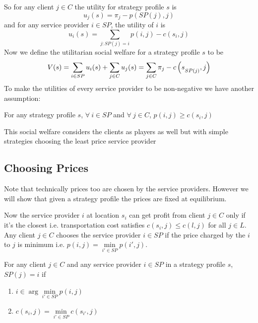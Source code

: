 So for any client $j\in C$ the utility for strategy profile $s$ is $$u_j(s)=\pi_j-p(SP(j),j)$$  and for  any service provider $i\in SP$, the utility of $i$ is $$u_i(s)=\sum\limits_{j\colon SP(j)=i}p(i,j)-c(s_i,j)$$ Now we define the utilitarian social welfare for a strategy profile $s$ to be $$V(s)=\sum\limits_{i\in SP}u_i(s)+\sum\limits_{j\in C}u_j(s)=\sum\limits_{j\in C}\pi_j-c\left(s\strut_{SP(j)},j\right)$$
To make the utilities of every service provider to be non-negative we have another assumption:
\begin{assumption}
	For any strategy profile $s$, $\forall\ i\in SP$ and $\forall\ j\in C$, $p(i,j)\geq c(s_i,j)$
\end{assumption}
\begin{remark}
	This social welfare considers the clients as players as well but with simple strategies choosing the least price service provider
\end{remark}

\subsection{Choosing Prices}
Note that technically prices too are chosen by the service providers. However we will show that given a strategy profile the prices are fixed at equilibrium.

Now the service provider $i$ at location $s_i$ can get profit from client $j\in C$ only if it's the closest i.e. transportation cost satisfies $c(s_i,j)\leq c(l,j)$ for all $j\in L$.  Any client $j\in C$ chooses the service provider $i\in SP$ if the price charged by the $i$ to $j$ is minimum i.e. $p(i,j)=\min\limits_{i'\in SP}p(i',j)$.
\begin{observation*}
	For any client $j\in C$ and any service provider $i\in SP$ in a strategy profile $s$,  $SP(j)=i$ if \begin{enumerate}[label=(\roman*)]
		\item $i\in \arg\min\limits_{i'\in SP}p(i,j)$
		\item $c(s_i,j)=\min\limits_{i'\in SP}c(s_{i'},j)$
	\end{enumerate}
\end{observation*}

